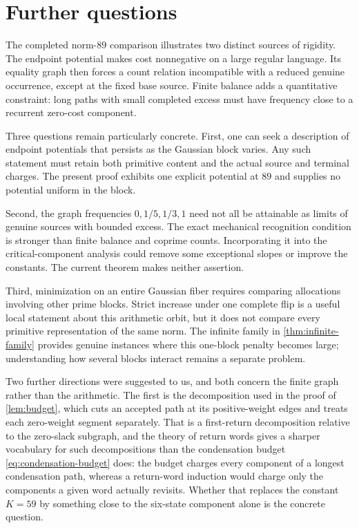 \section{Further questions}
\label{sec:conclusion}

The completed norm-$89$ comparison illustrates two distinct sources of
rigidity. The endpoint potential makes cost nonnegative on a large regular
language. Its equality graph then forces a count relation incompatible
with a reduced genuine occurrence, except at the fixed base source.
Finite balance adds a quantitative constraint: long paths with small
completed excess must have frequency close to a recurrent zero-cost
component.

Three questions remain particularly concrete. First, one can seek a
description of endpoint potentials that persists as the Gaussian block
varies. Any such statement must retain both primitive content and the
actual source and terminal charges. The present proof exhibits one explicit potential at $89$ and supplies no
potential uniform in the block.

Second, the graph frequencies $0,1/5,1/3,1$ need not all be attainable as
limits of genuine sources with bounded excess. The exact mechanical
recognition condition is stronger than finite balance and coprime
counts. Incorporating it into the critical-component analysis could
remove some exceptional slopes or improve the constants. The current
theorem makes neither assertion.

Third, minimization on an entire Gaussian fiber requires comparing
allocations involving other prime blocks. Strict increase under one
complete flip is a useful local statement about this arithmetic orbit,
but it does not compare every primitive representation of the same norm.
The infinite family in \cref{thm:infinite-family} provides genuine
instances where this one-block penalty becomes large; understanding
how several blocks interact remains a separate problem.

Two further directions were suggested to us, and both concern the finite
graph rather than the arithmetic. The first is the decomposition used in
the proof of \cref{lem:budget}, which cuts an accepted path at its
positive-weight edges and treats each zero-weight segment separately. That
is a first-return decomposition relative to the zero-slack subgraph, and the
theory of return words gives a sharper vocabulary for such decompositions
than the condensation budget \eqref{eq:condensation-budget} does: the
budget charges every component of a longest condensation path, whereas a
return-word induction would charge only the components a given word
actually revisits. Whether that replaces the constant $K=59$ by something
close to the six-state component alone is the concrete question.

